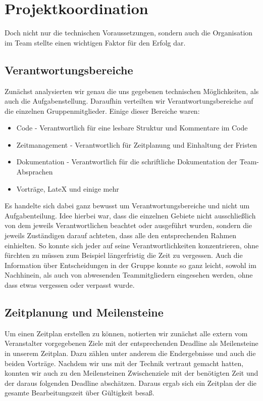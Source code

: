 \section{Projektkoordination}
\label{sec:projektkoordination}

Doch nicht nur die technischen Voraussetzungen, sondern auch die Organisation im Team stellte einen wichtigen Faktor für den Erfolg dar.

\subsection{Verantwortungsbereiche}
Zunächst analysierten wir genau die uns gegebenen technischen Möglichkeiten, als auch die Aufgabenstellung. Daraufhin verteilten wir Verantwortungsbereiche auf die einzelnen Gruppenmitglieder. Einige dieser Bereiche waren:
\begin{itemize}
	\item Code - Verantwortlich für eine lesbare Struktur und Kommentare im Code
	\item Zeitmanagement - Verantwortlich für Zeitplanung und Einhaltung der Fristen
	\item Dokumentation - Verantwortlich für die schriftliche Dokumentation der Team-Absprachen
	\item Vorträge, LateX und einige mehr
\end{itemize}
Es handelte sich dabei ganz bewusst um Verantwortungsbereiche und nicht um Aufgabenteilung. Idee hierbei war, dass die einzelnen Gebiete nicht ausschließlich von dem jeweils Verantwortlichen beachtet oder ausgeführt wurden, sondern die jeweils Zuständigen darauf achteten, dass alle den entsprechenden Rahmen einhielten. 
So konnte sich jeder auf seine Verantwortlichkeiten konzentrieren, ohne fürchten zu müssen zum Beispiel längerfristig die Zeit zu vergessen. Auch die Information über Entscheidungen in der Gruppe konnte so ganz leicht, sowohl im Nachhinein, als auch von abwesenden Teammitgliedern eingesehen werden, ohne dass etwas vergessen oder verpasst wurde.


\subsection{Zeitplanung und Meilensteine}
Um einen Zeitplan erstellen zu können, notierten wir zunächst alle extern vom Veranstalter vorgegebenen Ziele mit der entsprechenden Deadline als Meilensteine in unserem Zeitplan. Dazu zählen unter anderem die Endergebnisse und auch die beiden Vorträge. Nachdem wir uns mit der Technik vertraut gemacht hatten, konnten wir auch zu den Meilensteinen Zwischenziele mit der benötigten Zeit und der daraus folgenden Deadline abschätzen. Daraus ergab sich ein Zeitplan der die gesamte Bearbeitungszeit über Gültigkeit besaß.

